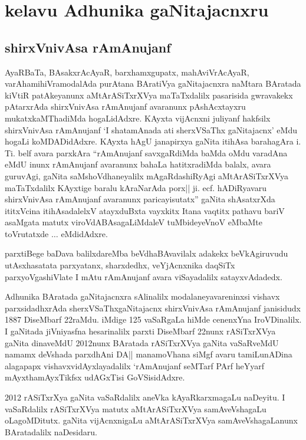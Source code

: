 \chapter{kelavu Adhunika gaNitajacnxru}

\section{shirxVnivAsa rAmAnujanf}


AyaRBaTa, BAsakxrAcAyaR, barxhamxgupatx, mahAviVrAcAyaR, varAha\-mihiVra\break modalAda purAtana BAratiVya gaNitajacnxra naMtara BAratada kiVtiR patAkeyanunx aMtA\-rASiTxrXVya maTaTxdalilx pasarisida gwravakekx pAtarxrAda shirxVnivAsa rAmAnujanf avaranunx pAshAcxtayxru mukatxkaMThadiMda hogaLidAdxre. KAyxta vijAcnxni juliyanf hakfsilx shirxVnivAsa rAmAnujanf `I shatamAnada ati sherxVSaThx gaNitajacnx' eMdu hogaLi koMDADidAdxre. KAyxta hAgU janapirxya gaNita itihAsa barahagAra i. Ti. belf avara parxkAra ``rAmAnu\-janf savxgaRdiMda baMda oMdu varadAna eMdU inunx rAmAnujanf avaranunx bahaLa hatitxradiMda balalx, avara guruvAgi, gaNita saMshoVdhaneyalilx mAgaRdashiRyAgi aMtArASiTxrXVya maTaTxdalilx KAyxtige baralu kAraNarAda porx|| ji. ecf. hADiRyavaru shirxVnivAsa rAmAnujanf avaranunx paricayisutatx'' gaNita shAsatxrXda ititxVcina itihAsadalelxV atayxduBxta vayxkitx Itana vaqtitx pathavu bariV asaMgata matutx viroVdA\-BAsagaLiMdaleV tuMbideyeVnoV eMbaMte toVrutatxde $\ldots$ eMdidAdxre.

parxtiBege baDava balilxdareMba beVdhaBAvavilalx adakekx beVkAgiruvudu utAsxha\break satata parxyatanx, sharxdedhx, veYjAcnxnika daqSiTx parxyoVgashiVlate I mAtu rAmAnujanf avara viSayadalilx satayxvAdadedx.

Adhunika BAratada gaNitajacnxra sAlinalilx modalaneyavareninxsi vishavx parxsidadhxrAda sherxVSaThxgaNitajacnx shirxVnivAsa rAmAnujanf janisidudx {\rm 1887} DiseMbarf {\rm 22}raMdu. iMdige {\rm 125} vaSaRgaLa hiMde cenenxYna IroVDinalilx. I gaNitada jiVniyasfna hesarinalilx parxti DiseM\-barf {\rm 22}nunx rASiTxrXVya gaNita dinaveMdU {\rm 2012}nunx BAratada rASiTxrXVya gaNita vaSaR\-veMdU namamx deVshada parxdhAni DA|| manamoVhana siMgf avaru tamiLunADina alagapapx vishavxvidAyxlayadalilx `rAmAnujanf seMTarf PArf heYyarf mAyxthamAyxTikfsx udAGxTisi GoVSisidAdxre.

{\rm 2012} rASiTxrXya gaNita vaSaRdalilx aneVka kAyaRkarxmagaLu naDeyitu. I vaSaRdalilx rASiTxrXVya matutx aMtArASiTxrXVya samAveVshagaLu oLagoMDitutx. gaNita vijAcnxnigaLu aMtArASiTxrXVya samAveVshagaLanunx BAratadalilx naDesidaru.

